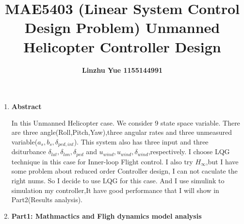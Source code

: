 \documentclass[12pt, a4paper]{article}
\title{MAE5403 (Linear System Control Design Problem) \textbf {Unmanned Helicopter Controller Design} }
\author{\textbf {Linzhu Yue 1155144991}}
\begin{document}
 
\maketitle
\begin{enumerate}[1.]\setlength{\itemsep}{1cm}

\item  \textbf{Abstract}


\hspace{0.5em}In this Unmanned Helicopter case. We consider 9 state space variable. There are three angle(Roll,Pitch,Yaw),three angular rates and three unmeasured
variable($a_s,b_s,\delta_{ped,int}$). This system also has three input and three dsiturbance $\delta_{lat},\delta_{lon},\delta_{ped}$ and $u_{wind},u_{wind},\delta_{wind}$,respectively.
I choose LQG technique in this case for Inner-loop Flight control. I also try $H_{\infty}$,but I have some problem about reduced order Controller design,
I can not caculate the right nums. So I decide to use LQG for this case. And I use simulink to simulation my controller,It have good performance that I will show in Part2(Results analysis).

\item  \textbf{ Part1: Mathmactics and Fligh dynamics model analysis}
\end{enumerate}
\end{document}
